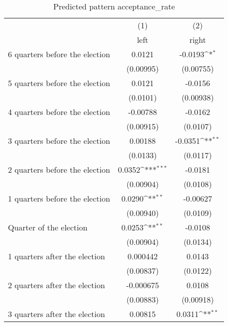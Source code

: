 \begin{table}[htbp]\centering
\def\sym#1{\ifmmode^{#1}\else\(^{#1}\)\fi}
\caption{Predicted pattern acceptance\_rate}
\begin{tabular}{l*{2}{c}}
\hline\hline
                    &\multicolumn{1}{c}{(1)}&\multicolumn{1}{c}{(2)}\\
                    &\multicolumn{1}{c}{left}&\multicolumn{1}{c}{right}\\
\hline
 6 quarters before the election&      0.0121         &     -0.0193\sym{*}  \\
                    &   (0.00995)         &   (0.00755)         \\
[1em]
 5 quarters before the election&      0.0121         &     -0.0156         \\
                    &    (0.0101)         &   (0.00938)         \\
[1em]
 4 quarters before the election&    -0.00788         &     -0.0162         \\
                    &   (0.00915)         &    (0.0107)         \\
[1em]
 3 quarters before the election&     0.00188         &     -0.0351\sym{**} \\
                    &    (0.0133)         &    (0.0117)         \\
[1em]
 2 quarters before the election&      0.0352\sym{***}&     -0.0181         \\
                    &   (0.00904)         &    (0.0108)         \\
[1em]
 1 quarters before the election&      0.0290\sym{**} &    -0.00627         \\
                    &   (0.00940)         &    (0.0109)         \\
[1em]
Quarter of the election&      0.0253\sym{**} &     -0.0108         \\
                    &   (0.00904)         &    (0.0134)         \\
[1em]
 1 quarters after the election&    0.000442         &      0.0143         \\
                    &   (0.00837)         &    (0.0122)         \\
[1em]
 2 quarters after the election&   -0.000675         &      0.0108         \\
                    &   (0.00883)         &   (0.00918)         \\
[1em]
 3 quarters after the election&     0.00815         &      0.0311\sym{**} \\

\end{tabular}
\end{table}
